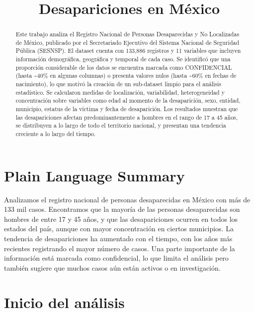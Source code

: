 \documentclass[
]{agujournal2019}
\begin{document}
\title{Desapariciones en México}



\begin{abstract}
Este trabajo analiza el Registro Nacional de Personas Desaparecidas y No
Localizadas de México, publicado por el Secretariado Ejecutivo del
Sistema Nacional de Seguridad Pública (SESNSP). El dataset cuenta con
133,886 registros y 11 variables que incluyen información demográfica,
geográfica y temporal de cada caso. Se identificó que una proporción
considerable de los datos se encuentra marcada como CONFIDENCIAL (hasta
\textasciitilde40\% en algunas columnas) o presenta valores nulos (hasta
\textasciitilde60\% en fechas de nacimiento), lo que motivó la creación
de un sub-dataset limpio para el análisis estadístico. Se calcularon
medidas de localización, variabilidad, heterogeneidad y concentración
sobre variables como edad al momento de la desaparición, sexo, entidad,
municipio, estatus de la víctima y fecha de desaparición. Los resultados
muestran que las desapariciones afectan predominantemente a hombres en
el rango de 17 a 45 años, se distribuyen a lo largo de todo el
territorio nacional, y presentan una tendencia creciente a lo largo del
tiempo.
\end{abstract}

\section*{Plain Language Summary}
Analizamos el registro nacional de personas desaparecidas en México con
más de 133 mil casos. Encontramos que la mayoría de las personas
desaparecidas son hombres de entre 17 y 45 años, y que las
desapariciones ocurren en todos los estados del país, aunque con mayor
concentración en ciertos municipios. La tendencia de desapariciones ha
aumentado con el tiempo, con los años más recientes registrando el mayor
número de casos. Una parte importante de la información está marcada
como confidencial, lo que limita el análisis pero también sugiere que
muchos casos aún están activos o en investigación.




\section{Inicio del análisis}\label{inicio-del-anuxe1lisis}
\end{document}
